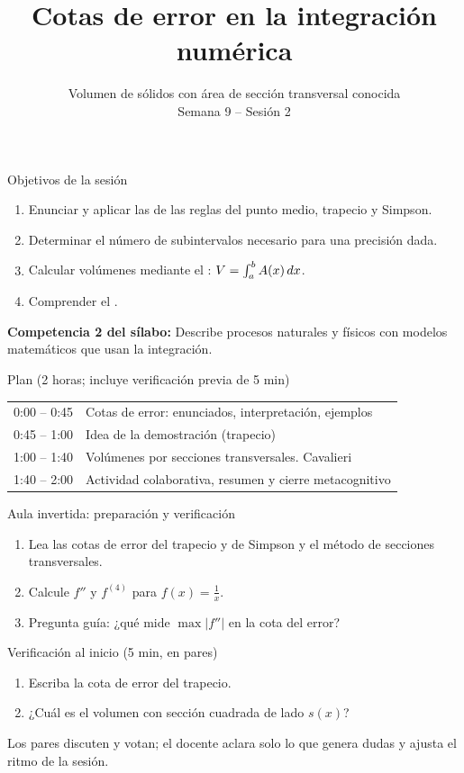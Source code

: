 \documentclass[10pt,aspectratio=169]{beamer}
\title[Errores y volúmenes por secciones]{Cotas de error en la integración numérica}
\subtitle{Volumen de sólidos con área de sección transversal conocida\\[2pt]\small Semana 9 -- Sesión 2}
\begin{document}
\begin{frame}
  \titlepage
\end{frame}

\begin{frame}{Objetivos de la sesión}
  \begin{enumerate}
    \item Enunciar y aplicar las  de las reglas del punto medio, trapecio y Simpson.
    \item Determinar el número de subintervalos necesario para una precisión dada.
    \item Calcular volúmenes mediante el : $V=\int_a^bA(x)\,dx$.
    \item Comprender el .
  \end{enumerate}
  \vspace{1mm}
  {\small\textbf{Competencia 2 del sílabo:} Describe procesos naturales y físicos con modelos matemáticos que usan la integración.}
  \begin{block}{Plan (2 horas; incluye verificación previa de 5 min)}
    \begin{tabular}{ll}
      0:00 -- 0:45 & Cotas de error: enunciados, interpretación, ejemplos\\
      0:45 -- 1:00 & Idea de la demostración (trapecio)\\
      1:00 -- 1:40 & Volúmenes por secciones transversales. Cavalieri\\
      1:40 -- 2:00 & Actividad colaborativa, resumen y cierre metacognitivo
    \end{tabular}
  \end{block}
\end{frame}

\begin{frame}{Aula invertida: preparación y verificación}
  \small
  \begin{previa}
    \begin{enumerate}
      \item Lea las cotas de error del trapecio y de Simpson y el método de secciones transversales.
      \item Calcule $f''$ y $f^{(4)}$ para $f(x)=\frac1x$.
      \item Pregunta guía: ¿qué mide $\max|f''|$ en la cota del error?
    \end{enumerate}
  \end{previa}
  \begin{block}{Verificación al inicio (5 min, en pares)}
    \begin{enumerate}
      \item Escriba la cota de error del trapecio.
      \item ¿Cuál es el volumen con sección cuadrada de lado $s(x)$?
    \end{enumerate}
    Los pares discuten y votan; el docente aclara solo lo que genera dudas y ajusta el ritmo de la sesión.
  \end{block}
\end{frame}
\end{document}
